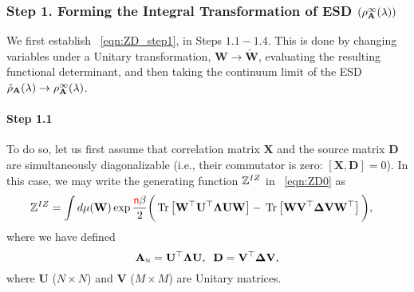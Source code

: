 \subsubsection{Step 1. Forming the Integral Transformation of ESD 
\texorpdfstring{$(\rho_{\mathbf{A}}^{\infty}(\lambda))$}{rho(lambda)}}
\label{sxn:tanaka_step1}
We first establish \EQN~\ref{eqn:ZD_step1}, in Steps $1.1-1.4$.
This is done by changing variables under a Unitary transformation, $\mathbf{W}\rightarrow\mathbf{\check{W}}$,
evaluating the resulting functional determinant,
and then taking the continuum limit of the ESD
$\tilde{\rho}_{\mathbf{A}}(\lambda)\rightarrow\rho^{\infty}_{\mathbf{A}}(\lambda)$.

\paragraph{Step 1.1}
To do so, let us first assume that \Teacher correlation matrix $\mathbf{X}$ and the source matrix $\mathbf{D}$
are simultaneously diagonalizable
(i.e., their commutator is zero: $[\mathbf{X}, \mathbf{D}]=0$).
In this case, we may write the generating function $\mathbb{Z}^{IZ}$ in \EQN~\ref{eqn:ZD0} as
%
\begin{align}
\label{eqn:Z-diag}
\mathbb{Z}^{IZ} &= \int d\mu(\mathbf{W}) \exp\frac{{\color{red}\sf{n}}\beta}{2}
 \bigg( 
\mbox{}\operatorname{Tr}\left[\mathbf{W}^{\top}\mathbf{U}^{\top}\mathbf{\Lambda}\mathbf{U}\mathbf{W}\right] 
- \mbox{}\operatorname{Tr}\left[\mathbf{W}\mathbf{V}^{\top}\mathbf{\Delta}\mathbf{V}\mathbf{W}^{\top}\right] 
\bigg)  ,
\end{align}
where we have defined
%
\begin{equation}
\label{eqn:diag-A-D}
    {\mathbf{A}}_{\text{\tiny N}}=\mathbf{U}^{\top}\mathbf{\Lambda}\mathbf{U},\;\;
    \mathbf{D}=\mathbf{V}^{\top}\mathbf{\Delta}\mathbf{V}  ,
\end{equation}
%
where $\mathbf{U}$ ($N\times N$) and $\mathbf{V}$ ($M\times M$) are Unitary matrices.
%
